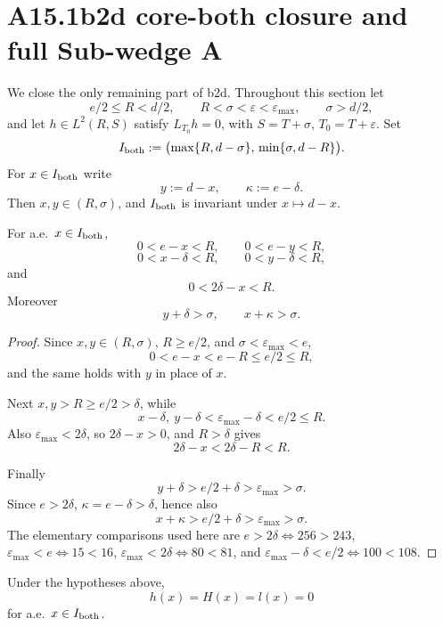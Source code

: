 \section{A15.1b2d core-both closure and full Sub-wedge A}
\label{sec:p12-b2d-core-both}

We close the only remaining part of b2d.  Throughout this section let
\[
e/2 \le R < d/2,\qquad
R < \sigma < \varepsilon < \varepsilon_{\max},
\qquad
\sigma>d/2,
\]
and let \(h\in L^2(R,S)\) satisfy \(L_{T_0}h=0\), with
\(S=T+\sigma\), \(T_0=T+\varepsilon\).
Set
\[
I_{\rm both}:=
\bigl(\max\{R,d-\sigma\},\,\min\{\sigma,d-R\}\bigr).
\]
For \(x\in I_{\rm both}\) write
\[
y:=d-x,\qquad \kappa:=e-\delta.
\]
Then \(x,y\in(R,\sigma)\), and \(I_{\rm both}\) is invariant under
\(x\mapsto d-x\).

\begin{lemma}
\label{lem:p12-b2d-core-both-support}
For a.e.\ \(x\in I_{\rm both}\),
\[
0<e-x<R,\qquad 0<e-y<R,
\]
\[
0<x-\delta<R,\qquad 0<y-\delta<R,
\]
and
\[
0<2\delta-x<R.
\]
Moreover
\[
y+\delta>\sigma,\qquad x+\kappa>\sigma.
\]
\end{lemma}

\begin{proof}
Since \(x,y\in(R,\sigma)\), \(R\ge e/2\), and
\(\sigma<\varepsilon_{\max}<e\),
\[
0<e-x<e-R\le e/2\le R,
\]
and the same holds with \(y\) in place of \(x\).

Next \(x,y>R\ge e/2>\delta\), while
\[
x-\delta,\ y-\delta
<\varepsilon_{\max}-\delta<e/2\le R.
\]
Also \(\varepsilon_{\max}<2\delta\), so \(2\delta-x>0\), and
\(R>\delta\) gives
\[
2\delta-x<2\delta-R<R.
\]

Finally
\[
y+\delta>e/2+\delta>\varepsilon_{\max}>\sigma.
\]
Since \(e>2\delta\), \(\kappa=e-\delta>\delta\), hence also
\[
x+\kappa>e/2+\delta>\varepsilon_{\max}>\sigma.
\]
The elementary comparisons used here are
\(e>2\delta\iff256>243\),
\(\varepsilon_{\max}<e\iff15<16\),
\(\varepsilon_{\max}<2\delta\iff80<81\), and
\(\varepsilon_{\max}-\delta<e/2\iff100<108\).
\end{proof}

\begin{theorem}
\label{thm:p12-b2d-core-both-full}
Under the hypotheses above,
\[
h(x)=H(x)=l(x)=0
\]
for a.e.\ \(x\in I_{\rm both}\).
\end{theorem}

